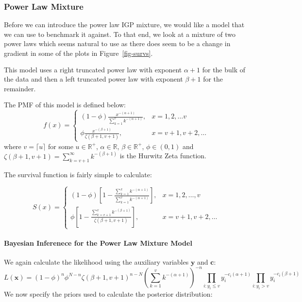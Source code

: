 \documentclass[
]{article}
\let\oldparagraph\paragraph
\renewcommand{\paragraph}[1]{\oldparagraph{#1}\mbox{}}
\begin{document}
\subsubsection{Power Law Mixture}\label{sec-plpl}

Before we can introduce the power law IGP mixture, we would like a model
that we can use to benchmark it against. To that end, we look at a
mixture of two power laws which seems natural to use as there does seem
to be a change in gradient in some of the plots in
Figure~\ref{fig-survs}.

This model uses a right truncated power law with exponent \(\alpha+1\)
for the bulk of the data and then a left truncated power law with
exponent \(\beta+1\) for the remainder.

The PMF of this model is defined below: \[
f(x) = \begin{cases}
(1-\phi)\frac{x^{-(\alpha+1)}}{\sum_{k=1}^v k^{-(\alpha+1)}}, &x=1,2,\ldots v\\
\phi\frac{x^{-(\beta+1)}}{\zeta(\beta+1, v+1)}, &x=v+1,v+2,\ldots
\end{cases}
\] where \(v=\lceil u\rceil\) for some \(u\in\mathbb{R}^+\),
\(\alpha\in\mathbb{R}\), \(\beta\in\mathbb{R}^+\), \(\phi\in(0,1)\) and
\(\zeta(\beta+1, v+1) = \sum_{k=v+1}^\infty k^{-(\beta+1)}\) is the
Hurwitz Zeta function.

The survival function is fairly simple to calculate:

\[
S(x) = \begin{cases}
(1-\phi)\left[1-\frac{\sum_{k=1}^x k^{-(\alpha+1)}}{\sum_{k=1}^v k^{-(\alpha+1)}}\right],&x=1,2,\ldots,v \\
\phi\left[1-\frac{\sum_{k=v+1}^x k^{-(\beta+1)}}{\zeta(\beta+1, v+1)}\right],&x=v+1,v+2,\ldots
\end{cases}
\]

\paragraph{Bayesian Inferenece for the Power Law Mixture
Model}\label{bayesian-inferenece-for-the-power-law-mixture-model}

We again calculate the likelihood using the auxiliary variables
\(\boldsymbol{y}\) and \(\boldsymbol{c}\): \[
L(\boldsymbol{x}) = (1-\phi)^n\phi^{N-n}\zeta(\beta+1, v+1)^{n-N}\left(\sum_{k=1}^v k^{-(\alpha+1)}\right)^{-n}\prod_{i:y_i\le v}y_i^{-c_i(\alpha+1)}\prod_{i:y_i>v}y_i^{-c_i(\beta+1)}
\] We now specify the priors used to calculate the posterior
distribution:
\end{document}
